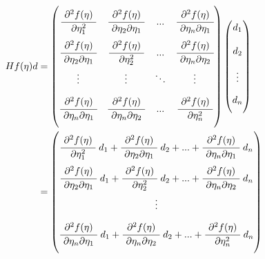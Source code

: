 \documentclass[]{article}
\begin{document}
\begin{align}
     Hf(\eta)d &= \begin{pmatrix} \\[-.85em]
     \cfrac{ \ \partial^2 f(\eta) \ }{ \partial \eta_1^2} & \cfrac{ \ \partial^2 f(\eta) \ }{ \ \partial \eta_2 \partial \eta_1 \ } & ... & \cfrac{ \ \partial^2 f(\eta) \ }{ \ \partial \eta_n \partial \eta_1 \ } \\[1.25em]
     \cfrac{ \ \partial^2 f(\eta) \ }{ \ \partial \eta_2 \partial \eta_1 \ } & \cfrac{ \ \partial^2 f(\eta) \ }{ \ \partial \eta_2^2   \ } & ... & \cfrac{ \ \partial^2 f(\eta) \ }{ \ \partial \eta_n \partial \eta_2 \ } \\[1em]
     \vdots & \vdots & \ddots & \vdots \\[1em]
    \cfrac{ \ \partial^2 f(\eta) \ }{ \ \partial \eta_n \partial \eta_1 \ } & \cfrac{ \ \partial^2 f(\eta) \ }{ \ \partial \eta_n \partial \eta_2   \ } & ... & \cfrac{ \ \partial^2 f(\eta) \ }{ \ \partial \eta^2_n \ } \\[1.25em]
     \end{pmatrix} \begin{pmatrix} \\[-.85em] d_1     \\[1.25em] d_2  \\[1em] \vdots  \\[1em] d_n  \\[.85em]  \end{pmatrix} \\
     &= \begin{pmatrix} \\[-.85em]
     \cfrac{ \ \partial^2 f(\eta) \ }{ \partial \eta_1^2} \ d_1 + \cfrac{ \ \partial^2 f(\eta) \ }{ \ \partial \eta_2 \partial \eta_1 \ } \ d_2 + ... + \cfrac{ \ \partial^2 f(\eta) \ }{ \ \partial \eta_n \partial \eta_1 \ } \ d_n \\[1.25em]
     \cfrac{ \ \partial^2 f(\eta) \ }{ \ \partial \eta_2 \partial \eta_1 \ } \ d_1 + \cfrac{ \ \partial^2 f(\eta) \ }{ \ \partial \eta_2^2   \ } \ d_2  + ... + \cfrac{ \ \partial^2 f(\eta) \ }{ \ \partial \eta_n \partial \eta_2 \ } \ d_n \\[1em]
    \vdots \\[1em]
    \cfrac{ \ \partial^2 f(\eta) \ }{ \ \partial \eta_n \partial \eta_1 \ } \ d_1 + \cfrac{ \ \partial^2 f(\eta) \ }{ \ \partial \eta_n \partial \eta_2   \ } \ d_2 + ... + \cfrac{ \ \partial^2 f(\eta) \ }{ \ \partial \eta^2_n \ } \ d_n \\[1.25em]
     \end{pmatrix} \\

\end{align}
\end{document}
